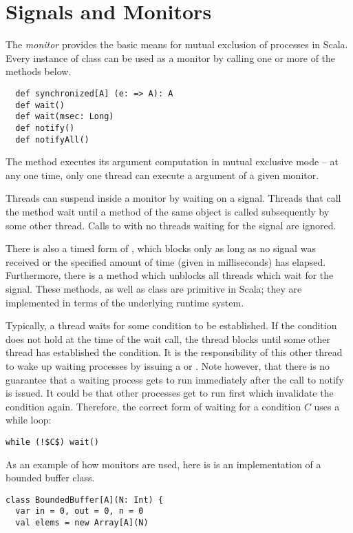 {\section{Signals and Monitors}

\example
The {\em monitor} provides the basic means for mutual exclusion
of processes in Scala. Every instance of class  can be
used as a monitor by calling one or more of the methods below.
\begin{lstlisting}
  def synchronized[A] (e: => A): A
  def wait()
  def wait(msec: Long)
  def notify()
  def notifyAll()
\end{lstlisting}
The  method executes its argument computation
 in mutual exclusive mode -- at any one time, only one thread
can execute a  argument of a given monitor.

Threads can suspend inside a monitor by waiting on a signal.  Threads
that call the  method wait until a  method of
the same object is called subsequently by some other thread. Calls to
 with no threads waiting for the signal are ignored.

There is also a timed form of , which blocks only as long
as no signal was received or the specified amount of time (given in
milliseconds) has elapsed. Furthermore, there is a 
method which unblocks all threads which wait for the signal.  These
methods, as well as class  are primitive in Scala; they
are implemented in terms of the underlying runtime system.

Typically, a thread waits for some condition to be established. If the
condition does not hold at the time of the wait call, the thread
blocks until some other thread has established the condition. It is
the responsibility of this other thread to wake up waiting processes
by issuing a  or . Note however, that
there is no guarantee that a waiting process gets to run immediately
after the call to notify is issued. It could be that other processes
get to run first which invalidate the condition again. Therefore, the
correct form of waiting for a condition $C$ uses a while loop:
\begin{lstlisting}
while (!$C$) wait()
\end{lstlisting}

As an example of how monitors are used, here is is an implementation
of a bounded buffer class.
\begin{lstlisting}
class BoundedBuffer[A](N: Int) {
  var in = 0, out = 0, n = 0
  val elems = new Array[A](N)


\end{lstlisting}}
